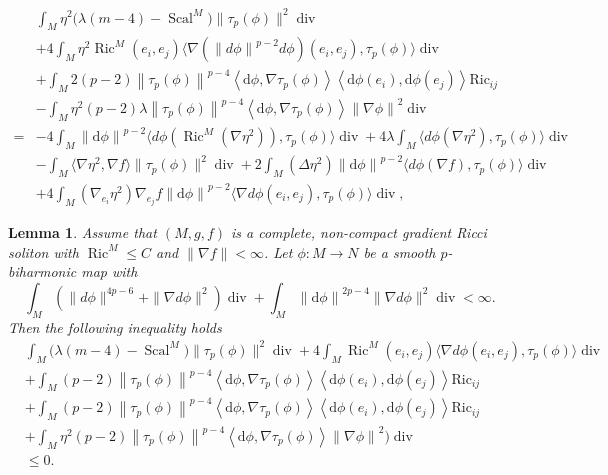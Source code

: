 \documentclass[10pt,a4paper]{amsart}
\newtheorem{lem}{Lemma}
\def\Ric {\mathrm{Ric}}
\def\d {\mathrm{d}}
\newcommand{\dv}{\operatorname{div}}
\def\la{\lambda}
\renewcommand{\leq}{\leqslant}
\def\na{\ensuremath{\nabla}}
\newcommand{\norm}[1]{\left\lVert#1\right\rVert}%
\begin{document}
\begin{equation}\label{13}
	\begin{split}
			&\int_M\eta^2\big(\lambda(m-4)-\operatorname{Scal}^M\big)\|\tau_p(\phi)\|^2\dv\\
			&+4\int_M\eta^2\operatorname{Ric}^M(e_i,e_j)\langle\na \left(\norm{d\phi}^{p-2} d\phi \right)(e_i,e_j),\tau_p(\phi)\rangle \dv \\
		&+\int_M 2(p-2)\norm{\tau_p(\phi)}^{p-4}\left\langle \d \phi,\na \tau_p(\phi) \right\rangle\left\langle \d \phi(e_i),\d \phi(e_j) \right\rangle\Ric_{ij}\\&-\int_M \eta^2(p-2)\la\norm{\tau_p(\phi)}^{p-4}\left\langle \d \phi,\na \tau_p(\phi) \right\rangle\norm{\na \phi}^2 \dv\\
		=&
		-4\int_M\norm{\d \phi}^{p-2}\langle d\phi(\operatorname{Ric}^M(\nabla\eta^2)),\tau_p(\phi)\rangle \dv 
		+4\lambda\int_M\langle d\phi(\nabla\eta^2),\tau_p(\phi)\rangle \dv 
		\\
		&-\int_M\langle\nabla\eta^2,\nabla f\rangle\|\tau_p(\phi)\|^2 \dv +2\int_M(\Delta\eta^2)\norm{\d \phi}^{p-2}\langle d\phi(\nabla f),\tau_p(\phi)\rangle \dv 
		\\&+4\int_M(\nabla_{e_i}\eta^2)\nabla_{e_j}f\norm{\d \phi}^{p-2}\langle\na d\phi(e_i,e_j),\tau_p(\phi)\rangle \dv,
	\end{split}
\end{equation}

\begin{lem}\label{15}
	Assume that $(M,g,f)$ is a complete, non-compact gradient Ricci soliton
	with $\operatorname{Ric}^M\leq C$ and $\|\nabla f\|<\infty$.
	Let $\phi\colon M\to N$ be a smooth $p$-biharmonic map with 
	\begin{equation}\label{14}
		\int_M(\|d\phi\|^{4p-6}+\|\na d\phi\|^2)\dv+\int_M\norm{\d \phi}^{2p-4} \|\na d\phi\|^2 \dv<\infty.
	\end{equation}
	Then the following inequality holds
	\begin{equation}\label{20}
		\begin{split}
			&\int_M\big(\lambda(m-4)-\operatorname{Scal}^M\big)\|\tau_p(\phi)\|^2\dv
			+4\int_M\operatorname{Ric}^M(e_i,e_j)\langle\na d\phi(e_i,e_j),\tau_p(\phi)\rangle \dv\\
			&+\int_M (p-2)\norm{\tau_p(\phi)}^{p-4}\left\langle \d \phi,\na \tau_p(\phi) \right\rangle\left\langle \d \phi(e_i),\d \phi(e_j) \right\rangle\Ric_{ij}\\
			&+\int_M (p-2)\norm{\tau_p(\phi)}^{p-4}\left\langle \d \phi,\na \tau_p(\phi) \right\rangle\left\langle \d \phi(e_i),\d \phi(e_j) \right\rangle\Ric_{ij}\\&+\int_M \eta^2(p-2)\norm{\tau_p(\phi)}^{p-4}\left\langle \d \phi,\na \tau_p(\phi) \right\rangle\norm{\na \phi}^2\bigg) \dv\\
			&\leq 0.
		\end{split}
	\end{equation}
\end{lem}
\end{document}

